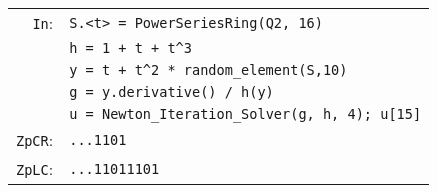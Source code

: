 \documentclass[sigconf]{acmart}
\newcommand{\cIn}{{\color{input} \tt \phantom{Zp}In}:}
\newcommand{\cZpCR}{{\color{output} \tt ZpCR}:}
\newcommand{\cZpLC}{{\color{output} \tt ZpLC}:}
\theoremstyle{definition}
\begin{document}
\smallskip

{\noindent \small
\begin{tabular}{rl}
\cIn
 & \verb?S.<t> = ?{\color{constructor}\verb?PowerSeriesRing?}\verb?(?{\color{ring}\verb?Q2?}\verb?, 16)? \\
 & \verb?h = 1 + t + t^3? \\
 & \verb?y = t + t^2 * ?{\color{function}\verb?random_element?}\verb?(S,10)? \\
 & \verb?g = y.derivative() / h(y)? \\
 & \verb?u = ?{\color{function}\verb?Newton_Iteration_Solver?}\verb?(g, h, 4); u[15]? \\
\cZpCR
 & \verb?...1101? \\
\cZpLC
 & \verb?...11011101? \\
\end{tabular}}

\end{document}
